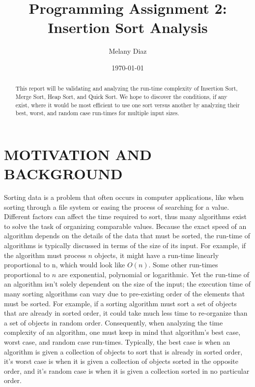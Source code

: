 \documentclass[12pt]{article}
\author{Melany Diaz}
\title{Programming Assignment 2: Insertion Sort Analysis}
\date{\today}
\begin{document}
\maketitle

\begin{abstract}
	
This report will be validating and analyzing the run-time complexity of Insertion Sort, Merge Sort, Heap Sort, and Quick Sort. We hope to discover the conditions, if any exist, where it would be most efficient to use one sort versus another by analyzing their best, worst, and random case run-times for multiple input sizes. 

\end{abstract}

\section*{MOTIVATION AND BACKGROUND}

Sorting data is a problem that often occurs in computer applications, like when sorting through a file system or easing the process of searching for a value. Different factors can affect the time required to sort, thus many algorithms exist to solve the task of organizing comparable values. Because the exact speed of an algorithm depends on the details of the data that must be sorted, the run-time of algorithms is typically discussed in terms of the size of its input. For example, if the algorithm must process $n$ objects, it might have a run-time linearly proportional to n, which would look like $O(n)$. Some other run-times proportional to $n$ are exponential, polynomial or logarithmic. Yet the run-time of an algorithm isn't solely dependent on the size of the input; the execution time of many sorting algorithms can vary due to pre-existing order of the elements that must be sorted. For example, if a sorting algorithm must sort a set of objects that are already in sorted order, it could take much less time to re-organize than a set of objects in random order. Consequently, when analyzing the time complexity of an algorithm, one must keep in mind that algorithm's best case, worst case, and random case run-times. Typically, the best case is when an algorithm is given a collection of objects to sort that is already in sorted order, it's worst case is when it is given a collection of objects sorted in the opposite order, and it's random case is when it is given a collection sorted in no particular order.\\
\end{document}
